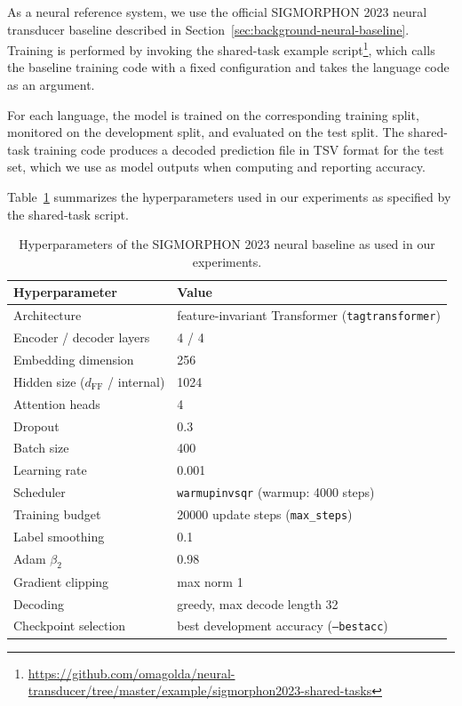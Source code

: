As a neural reference system, we use the official SIGMORPHON 2023 neural transducer baseline \parencite{goldman-etal-2023-sigmorphon} described in Section~\ref{sec:background-neural-baseline}. Training is performed by invoking the shared-task example script\footnote{\url{https://github.com/omagolda/neural-transducer/tree/master/example/sigmorphon2023-shared-tasks}}, which calls the baseline training code with a fixed configuration and takes the language code as an argument.

For each language, the model is trained on the corresponding training split, monitored on the development split, and evaluated on the test split. The shared-task training code produces a decoded prediction file in TSV format for the test set, which we use as model outputs when computing and reporting accuracy.

Table~\ref{tab:neural_hyperparameters} summarizes the hyperparameters used in our experiments as specified by the shared-task script.

\begin{table}[h]
\centering
\begin{tabular}{ll}
\toprule
Hyperparameter & Value \\
\midrule
Architecture & feature-invariant Transformer (\texttt{tagtransformer}) \\
Encoder / decoder layers & 4 / 4 \\
Embedding dimension & 256 \\
Hidden size ($d_{\mathrm{FF}}$ / internal) & 1024 \\
Attention heads & 4 \\
Dropout & 0.3 \\
Batch size & 400 \\
Learning rate & 0.001 \\
Scheduler & \texttt{warmupinvsqr} (warmup: 4000 steps) \\
Training budget & 20000 update steps (\texttt{max\_steps}) \\
Label smoothing & 0.1 \\
Adam $\beta_2$ & 0.98 \\
Gradient clipping & max norm 1 \\
Decoding & greedy, max decode length 32 \\
Checkpoint selection & best development accuracy (\texttt{--bestacc}) \\
\bottomrule
\end{tabular}
\caption{Hyperparameters of the SIGMORPHON 2023 neural baseline as used in our experiments.}
\label{tab:neural_hyperparameters}
\end{table}

